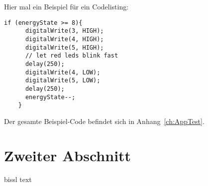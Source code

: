 Hier mal ein Beispiel für ein Codelisting:
\begin{lstlisting}[language=Arduino]
    if (energyState >= 8){
      digitalWrite(3, HIGH);
      digitalWrite(4, HIGH);
      digitalWrite(5, HIGH);
      // let red leds blink fast
      delay(250);
      digitalWrite(4, LOW);
      digitalWrite(5, LOW);
      delay(250);
      energyState--;
    }
\end{lstlisting}
Der gesamte Beispiel-Code befindet sich in Anhang~\ref{ch:AppTest}.
\section{Zweiter Abschnitt}

bissl text

